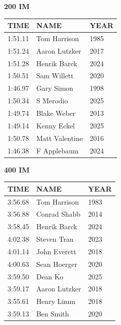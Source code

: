 \begin{table}[H]
\centering
\begin{minipage}[t]{0.48\textwidth}
\centering
\textbf{200 IM}\\[0.1cm]
\begin{tabular}{@{}p{1.8cm}p{2.8cm}p{1.2cm}@{}}
\hline
    \textbf{TIME} & \textbf{NAME} & \textbf{YEAR} \\
\hline
    1:51.11 & Tom Harrison & 1985 \\
    1:51.24 & Aaron Lutzker & 2017 \\
    1:51.28 & Henrik Barck & 2024 \\
    1:50.51 & Sam Willett & 2020 \\
    1:46.97 & Gary Simon & 1998 \\
    1:50.34 & S Merodio & 2025 \\
    1:49.74 & Blake Weber & 2013 \\
    1:49.14 & Kenny Eckel & 2025 \\
    1:50.78 & Matt Valentine & 2016 \\
    1:46.38 & F Applebaum & 2024 \\
\hline
\end{tabular}
\end{minipage}\hfill
\begin{minipage}[t]{0.48\textwidth}
\centering
\textbf{400 IM}\\[0.1cm]
\begin{tabular}{@{}p{1.8cm}p{2.8cm}p{1.2cm}@{}}
\hline
    \textbf{TIME} & \textbf{NAME} & \textbf{YEAR} \\
\hline
    3:56.68 & Tom Harrison & 1983 \\
    3:56.88 & Conrad Shabb & 2014 \\
    3:58.45 & Henrik Barck & 2024 \\
    4:02.38 & Steven Tran & 2023 \\
    4:01.14 & John Everett & 2018 \\
    4:00.63 & Sean Hoerger & 2020 \\
    3:59.50 & Dean Ko & 2025 \\
    3:59.17 & Aaron Lutzker & 2018 \\
    3:55.61 & Henry Limm & 2018 \\
    3:59.13 & Ben Smith & 2020 \\
\hline
\end{tabular}
\end{minipage}
\end{table}

